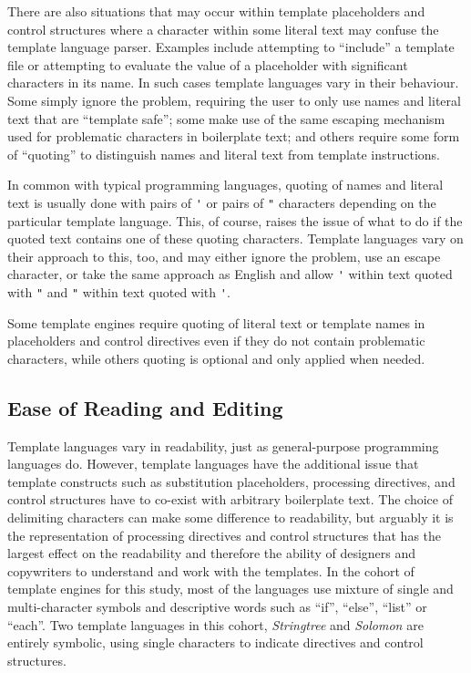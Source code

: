 There are also situations that may occur within template placeholders and control structures where a character within some literal text may confuse the \gls{template language} parser. Examples include attempting to \enquote{include} a template file or attempting to evaluate the value of a placeholder with significant characters in its name. In such cases \gls{template language}s vary in their behaviour. Some simply ignore the problem, requiring the user to only use names and literal text that are \enquote{template safe}; some make use of the same escaping mechanism used for problematic characters in boilerplate text; and others require some form of \enquote{quoting} to distinguish names and literal text from template instructions.

In common with typical \gls{programming language}s, quoting of names and literal text is usually done with pairs of \verb!'! or pairs of \verb!"! characters depending on the particular \gls{template language}. This, of course, raises the issue of what to do if the quoted text contains one of these quoting characters. Template languages vary on their approach to this, too, and may either ignore the problem, use an escape character, or take the same approach as English and allow \verb!'! within text quoted with \verb!"! and \verb!"! within text quoted with \verb!'!.

Some \gls{template engine}s require quoting of literal text or template names in placeholders and control directives even if they do not contain problematic characters, while others quoting is optional and only applied when needed.

\subsection{Ease of Reading and Editing}
\label{comp:readability}

Template languages vary in readability, just as general-purpose \gls{programming language}s do. However, \gls{template language}s have the additional issue that template constructs such as substitution placeholders, processing directives, and control structures have to co-exist with arbitrary boilerplate text. The choice of delimiting characters can make some difference to readability, but arguably it is the representation of processing directives and control structures that has the largest effect on the readability and therefore the ability of designers and copywriters to understand and work with the templates. In the cohort of \gls{template engine}s for this study, most of the languages use mixture of single and multi-character symbols and descriptive words such as \enquote{if}, \enquote{else}, \enquote{list} or \enquote{each}. Two \gls{template language}s in this cohort, \emph{Stringtree} and \emph{Solomon} are entirely symbolic, using single characters to indicate directives and control structures.

